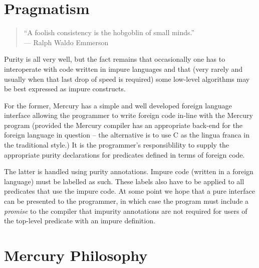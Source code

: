 
\section{Pragmatism}

\begin{quote}
``A foolish consistency is the hobgoblin of small minds.'' \\
\hfill --- Ralph Waldo Emmerson
\end{quote}

Purity is all very well, but the fact remains that
occasionally one has to interoperate with code written in
impure languages and that (very rarely and usually when that
last drop of speed is required) some low-level algorithms may
be best expressed as impure constructs.

For the former, Mercury has a simple and well developed
foreign language interface allowing the programmer to write
foreign code in-line with the Mercury program (provided the
Mercury compiler has an appropriate back-end for the foreign
language in question -- the alternative is to use C as the
lingua franca in the traditional style.)  It is the
programmer's responsiblility to supply the appropriate purity
declarations for predicates defined in terms of foreign code.

The latter is handled using purity annotations.  Impure code
(written in a foreign language) must be labelled as such.
These labels also have to be applied to all predicates that
use the impure code.  At some point we hope that a pure
interface can be presented to the programmer, in which case
the program must include a \emph{promise} to the compiler that
impurity annotations are not required for users of the
top-level predicate with an impure definition.

\section{Mercury Philosophy}




